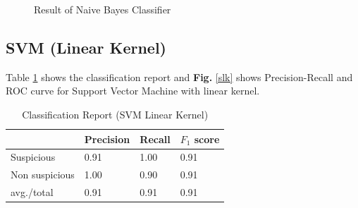 \begin{figure}[H]
\centering
{}%
\hfill %
%
\caption{Result of Naive Bayes Classifier}
\label{prrn}
\end{figure}


\subsection{\textbf{SVM (Linear Kernel)}}
Table \ref{SVML} shows the classification report and \textbf{Fig.} \ref{slk} shows Precision-Recall and ROC curve for Support Vector Machine with linear kernel.

\begin{table}[h!]
\begin{center}
\caption{Classification Report (SVM Linear Kernel)}
\begin{tabular}{|m{2.8cm} | m{1.5cm}| m{1.3cm}| m{1.5cm}|}
\hline
     & Precision & Recall & $F_1$ score\\
\hline
     Suspicious & 0.91 & 1.00 & 0.91\\
\hline 
     Non suspicious  & 1.00 & 0.90 & 0.91\\
\hline 
     avg./total & 0.91 & 0.91 & 0.91\\
\hline
\end{tabular}
\label{SVML}
\end{center}
\end{table}


